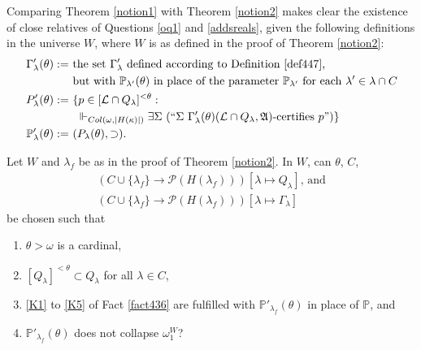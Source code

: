 \documentclass[12pt]{article}
\numberwithin{equation}{section}
\begin{document}
Comparing Theorem \ref{notion1} with Theorem \ref{notion2} makes clear the existence of close relatives of Questions \ref{oq1} and \ref{addsreals}, given the following definitions in the universe $W$, where $W$ is as defined in the proof of Theorem \ref{notion2}:
\begin{align*}
    \Gamma'_{\lambda}(\theta) := \ & \text{the set } \Gamma'_{\lambda} \text{ defined according to Definition \ref{def447},} \\
    & \text{but with } \mathbb{P}_{\lambda'}(\theta) \text{ in place of the parameter } \mathbb{P}_{\lambda'} \text{ for each } \lambda' \in \lambda \cap C \\
    P'_{\lambda}(\theta) := \ & \{p \in [\mathcal{L} \cap Q_{\lambda}]^{< \theta} : \\
    & \ \Vdash_{Col(\omega, |H(\kappa)|)} \exists \Sigma \ (``\Sigma \ \Gamma'_{\lambda}(\theta) (\mathcal{L} \cap Q_{\lambda}, \mathfrak{A}) \text{-certifies } p")\} \\
    \mathbb{P}'_{\lambda}(\theta) := \ & (P_{\lambda}(\theta), \supset) \text{.}
\end{align*}

\begin{ques}\label{oq2}
Let $W$ and $\lambda_f$ be as in the proof of Theorem \ref{notion2}. In $W$, can $\theta$, $C$, 
\begin{gather*}
    (C \cup \{\lambda_f\} \longrightarrow \mathcal{P}(H(\lambda_f))) [\lambda \mapsto Q_{\lambda}] \text{, and} \\
    (C \cup \{\lambda_f\} \longrightarrow \mathcal{P}(H(\lambda_f))) [\lambda \mapsto \Gamma_{\lambda}]
\end{gather*}
be chosen such that 
\begin{enumerate}[label=(\arabic*)]
    \item $\theta > \omega$ is a cardinal,
    \item $[Q_{\lambda}]^{< \theta} \subset Q_{\lambda}$ for all $\lambda \in C$,
    \item \ref{K1} to \ref{K5} of Fact \ref{fact436} are fulfilled with $\mathbb{P}'_{\lambda_f}(\theta)$ in place of $\mathbb{P}$, and
    \item $\mathbb{P}'_{\lambda_f}(\theta)$ does not collapse $\omega_1^W$?
\end{enumerate}
\end{ques}
\end{document}
